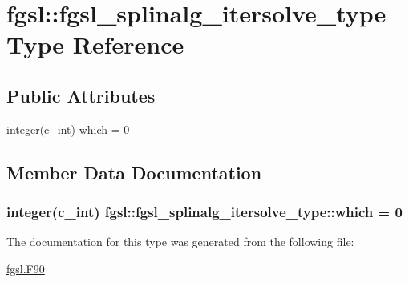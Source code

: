 \hypertarget{structfgsl_1_1fgsl__splinalg__itersolve__type}{}\section{fgsl\+:\+:fgsl\+\_\+splinalg\+\_\+itersolve\+\_\+type Type Reference}
\label{structfgsl_1_1fgsl__splinalg__itersolve__type}
\subsection*{Public Attributes}
\begin{DoxyCompactItemize}
\item 
integer(c\+\_\+int) \hyperlink{structfgsl_1_1fgsl__splinalg__itersolve__type_a41af7ecbd97a7aa8b5b691dee427274c}{which} = 0
\end{DoxyCompactItemize}


\subsection{Member Data Documentation}
\hypertarget{structfgsl_1_1fgsl__splinalg__itersolve__type_a41af7ecbd97a7aa8b5b691dee427274c}{}
\subsubsection[{which}]{\setlength{\rightskip}{0pt plus 5cm}integer(c\+\_\+int) fgsl\+::fgsl\+\_\+splinalg\+\_\+itersolve\+\_\+type\+::which = 0}\label{structfgsl_1_1fgsl__splinalg__itersolve__type_a41af7ecbd97a7aa8b5b691dee427274c}


The documentation for this type was generated from the following file\+:\begin{DoxyCompactItemize}
\item 
\hyperlink{fgsl_8F90}{fgsl.\+F90}\end{DoxyCompactItemize}
